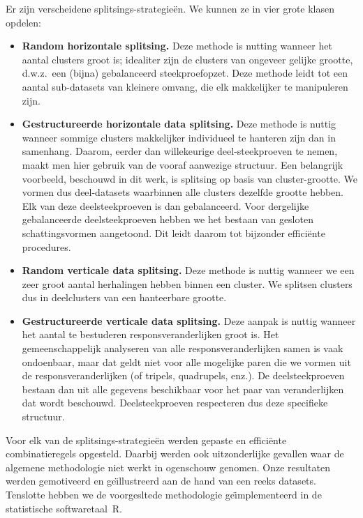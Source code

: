 \documentclass[14pt]{article}
\begin{document}
\begin{sloppypar}
Er zijn verscheidene splitsings-strategie\"en. We kunnen ze in vier grote klasen opdelen:
\begin{itemize}
\item \textbf{Random horizontale splitsing.} 
Deze methode is nutting wanneer het aantal clusters groot is; idealiter zijn de clusters van ongeveer gelijke grootte, d.w.z.\ een (bijna) gebalanceerd steekproefopzet. Deze methode leidt tot een aantal sub-datasets van kleinere omvang, die elk makkelijker te manipuleren zijn.
\item \textbf{Gestructureerde horizontale data splitsing.} 
Deze methode is nuttig wanneer sommige clusters makkelijker individueel te hanteren zijn dan in samenhang. Daarom, eerder dan willekeurige deel-steekproeven te nemen, maakt men hier gebruik van de vooraf aanwezige structuur. Een belangrijk voorbeeld, beschouwd in dit werk, is splitsing op basis van cluster-grootte. We vormen dus deel-datasets waarbinnen alle clusters dezelfde grootte hebben. Elk van deze deelsteekproeven is dan gebalanceerd. Voor dergelijke gebalanceerde deelsteekproeven hebben we het bestaan van gesloten schattingsvormen aangetoond. Dit leidt daarom tot bijzonder effici\"ente procedures. 
\item \textbf{Random verticale data splitsing.} Deze methode is nuttig wanneer we een zeer groot aantal herhalingen hebben binnen een cluster. We splitsen clusters dus in deelclusters van een hanteerbare grootte.
\item \textbf{Gestructureerde verticale data splitsing.} Deze aanpak is nuttig wanneer het aantal te bestuderen responsveranderlijken groot is. Het gemeenschappelijk analyseren van alle responsveranderlijken samen is vaak ondoenbaar, maar dat geldt niet voor alle mogelijke paren die we vormen uit de responsveranderlijken (of tripels, quadrupels, enz.). De deelsteekproeven bestaan dan uit alle gegevens beschikbaar voor het paar van veranderlijken dat wordt beschouwd. Deelsteekproeven respecteren dus deze specifieke structuur. 
\end{itemize}
\end{sloppypar}

\begin{sloppypar}
Voor elk van de splitsings-strategie\"en werden gepaste en effici\"ente combinatieregels opgesteld. Daarbij werden ook uitzonderlijke gevallen waar de algemene methodologie niet werkt in ogenschouw genomen. Onze resultaten werden gemotiveerd en ge\"{\i}llustreerd aan de hand van een reeks datasets. Tenslotte hebben we de voorgesltede methodologie ge\"{\i}mplementeerd in de statistische softwaretaal~R. 
\end{sloppypar}
\vspace{1cm}
\end{document}
